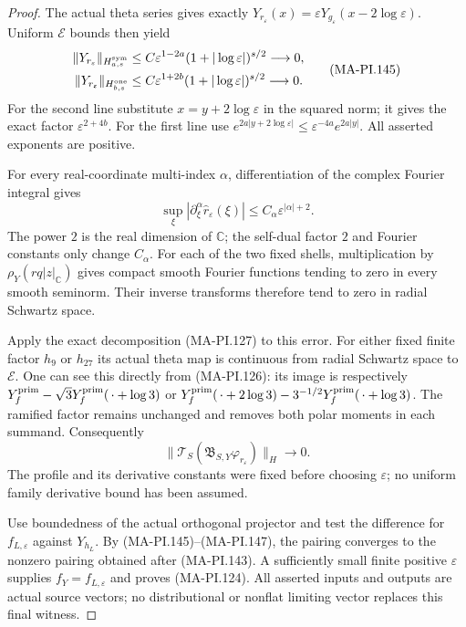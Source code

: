 \begin{proof}
The actual theta series gives exactly
$Y_{r_\varepsilon}(x)=
\varepsilon Y_{g_\varepsilon}(x-2\log\varepsilon)$.
Uniform $\mathcal E$ bounds then yield
\[
 \begin{split}
 \|Y_{r_\varepsilon}\|_{H^{\rm sym}_{a,s}}
    &\le C\varepsilon^{1-2a}
                    (1+|\log\varepsilon|)^{s/2}\longrightarrow0,\\
 \|Y_{r_\varepsilon}\|_{H^{\rm one}_{b,s}}
    &\le C\varepsilon^{1+2b}
                    (1+|\log\varepsilon|)^{s/2}\longrightarrow0.
 \end{split}
 \tag{MA-PI.145}
\]
For the second line substitute $x=y+2\log\varepsilon$
in the squared norm; it gives the exact factor
$\varepsilon^{2+4b}$.  For the first line use
$e^{2a|y+2\log\varepsilon|}
 \le\varepsilon^{-4a}e^{2a|y|}$.
All asserted exponents are positive.

For every real-coordinate multi-index $\alpha$,
differentiation of the complex Fourier integral gives
\[
 \sup_\xi|\partial_\xi^\alpha\widehat r_\varepsilon(\xi)|
                         \le C_\alpha\varepsilon^{|\alpha|+2}.
 \tag{MA-PI.146}
\]
The power $2$ is the real dimension of $\mathbb C$;
the self-dual factor $2$ and Fourier constants only
change $C_\alpha$.  For each of the two fixed shells,
multiplication by $\rho_Y(rq|z|_{\mathbb C})$ gives
compact smooth Fourier functions tending to zero
in every smooth seminorm.  Their inverse transforms
therefore tend to zero in radial Schwartz space.

Apply the exact decomposition (MA-PI.127) to this error.
For either fixed finite factor $h_9$ or $h_{27}$ its
actual theta map is continuous from radial Schwartz
space to $\mathcal E$.  One can see this directly
from (MA-PI.126): its image is respectively
$Y_f^{\rm prim}-\sqrt3Y_f^{\rm prim}(\,\cdot+\log3)$
or
$Y_f^{\rm prim}(\,\cdot+2\log3)
 -3^{-1/2}Y_f^{\rm prim}(\,\cdot+\log3)$.
The ramified factor remains unchanged and removes
both polar moments in each summand.  Consequently
\[
 \|\mathcal T_S(\mathfrak B_{S,Y}\varphi_{r_\varepsilon})\|_H
                                      \longrightarrow0.
 \tag{MA-PI.147}
\]
The profile and its derivative constants were fixed
before choosing $\varepsilon$; no uniform family
derivative bound has been assumed.

Use boundedness of the actual orthogonal projector and
test the difference for $f_{L,\varepsilon}$ against
$Y_{h_L}$.  By (MA-PI.145)--(MA-PI.147), the pairing
converges to the nonzero pairing obtained after
(MA-PI.143).  A sufficiently small finite positive
$\varepsilon$ supplies $f_Y=f_{L,\varepsilon}$ and
proves (MA-PI.124).  All asserted inputs and outputs
are actual source vectors; no distributional or
nonflat limiting vector replaces this final witness.
\end{proof}


